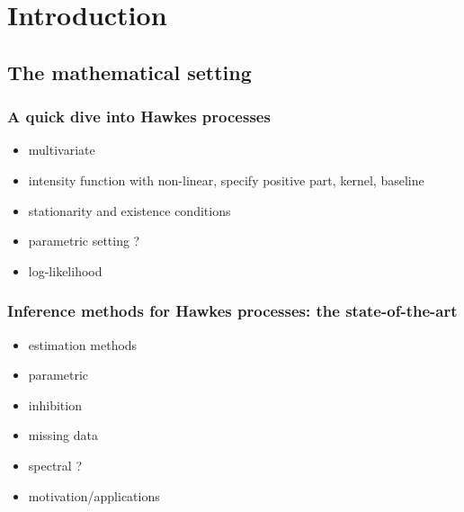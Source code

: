 \leadchapter{
}

\chapter{Introduction}

\section{The mathematical setting}\label{sec:chap0_introduction}
\subsection{A quick dive into Hawkes processes}\label{sec:chap0_hawkes_process}
    \begin{itemize}
        \item multivariate
        \item intensity function with non-linear, specify positive part, kernel, baseline
        \item stationarity and existence conditions
        \item parametric setting ? 
        \item log-likelihood
    \end{itemize}
\subsection{Inference methods for Hawkes processes: the state-of-the-art}\label{sec:chap0_related_works}
\begin{itemize}
    \item estimation methods
    \item parametric
    \item inhibition
    \item missing data
    \item spectral ? 
    \item motivation/applications
\end{itemize}

